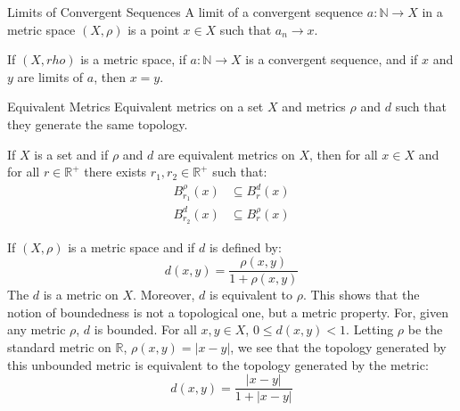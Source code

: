 \documentclass[crop=false,class=article,oneside]{standalone}
\begin{document}
            \begin{ldefinition}{Limits of Convergent Sequences}
                A limit of a convergent sequence $a:\mathbb{N}\rightarrow{X}$
                in a metric space $(X,\rho)$ is a point $x\in{X}$ such that
                $a_{n}\rightarrow{x}$.
            \end{ldefinition}
            \begin{theorem}
                If $(X,rho)$ is a metric space, if
                $a:\mathbb{N}\rightarrow{X}$ is a convergent sequence, and if
                $x$ and $y$ are limits of $a$, then $x=y$.
            \end{theorem}
            \begin{ldefinition}{Equivalent Metrics}
                Equivalent metrics on a set $X$ and metrics
                $\rho$ and $d$ such that they generate the same topology.
            \end{ldefinition}
            \begin{theorem}
                If $X$ is a set and if $\rho$ and $d$ are equivalent metrics
                on $X$, then for all $x\in{X}$ and for all
                $r\in\mathbb{R}^{+}$ there exists
                $r_{1},r_{2}\in\mathbb{R}^{+}$ such that:
                \begin{align}
                    B_{r_{1}}^{\rho}(x)&\subseteq{B}_{r}^{d}(x)\\
                    B_{r_{2}}^{d}(x)&\subseteq{B}_{r}^{\rho}(x)
                \end{align}
            \end{theorem}
            \begin{lexample}
                If $(X,\rho)$ is a metric space and if $d$ is defined by:
                \begin{equation}
                    d(x,y)=\frac{\rho(x,y)}{1+\rho(x,y)}
                \end{equation}
                The $d$ is a metric on $X$. Moreover, $d$ is equivalent to
                $\rho$. This shows that the notion of boundedness is not
                a topological one, but a metric property. For, given any
                metric $\rho$, $d$ is bounded. For all $x,y\in{X}$,
                $0\leq{d}(x,y)<1$. Letting $\rho$ be the standard metric on
                $\mathbb{R}$, $\rho(x,y)=|x-y|$, we see that the topology
                generated by this unbounded metric is equivalent to the
                topology generated by the metric:
                \begin{equation}
                    d(x,y)=\frac{|x-y|}{1+|x-y|}
                \end{equation}
            \end{lexample}
\end{document}
